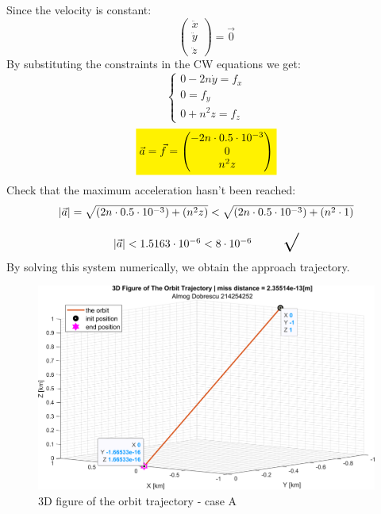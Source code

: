 \documentclass[11pt, a4paper]{article}
\begin{document}
\noindent Since the velocity is constant:
\begin{equation*}
    \begin{pmatrix}
        \ddot{x}\\
        \ddot{y}\\
        \ddot{z}
    \end{pmatrix} = \vec{0}
\end{equation*}
By substituting the constraints in the CW equations we get:
\begin{equation}
    \left\{\begin{array}{l}
        0-2n\dot{y}=f_x\\
        0=f_y\\
        0+n^2z=f_z
    \end{array}\right.
\end{equation}
\begin{equation}
    \colorbox{yellow}{$\vec{a} = \vec{f} = \begin{pmatrix}
        -2n\cdot0.5\cdot10^{-3}\\
        0\\
        n^2z
    \end{pmatrix}$}
\end{equation}
Check that the maximum acceleration hasn't been reached:
\begin{equation}
    \begin{array}{c}
        |\vec{a}| = \sqrt{\left(2n\cdot0.5\cdot10^{-3}\right) + \left(n^2z\right)} < \sqrt{\left(2n\cdot0.5\cdot10^{-3}\right) + \left(n^2\cdot1\right)} \\\\
        |\vec{a}| < 1.5163\cdot10^{-6} < 8\cdot10^{-6} \text{\hspace{1cm}\LARGE$\surd$}
    \end{array}
\end{equation}
By solving this system numerically, we obtain the approach trajectory.
\begin{figure}[H]
    \centering
    \includegraphics[width=1\textwidth]{images/graph1.png}
    \caption{3D figure of the orbit trajectory - case A}
    \label{fig:3D-plot-caseA}
\end{figure}
\end{document}

